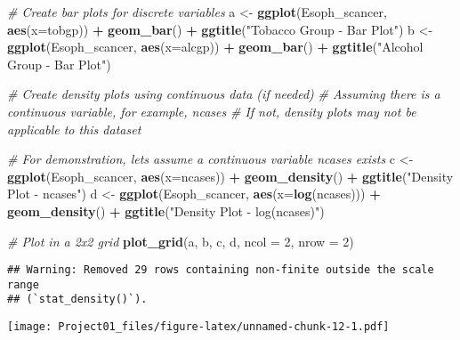 \documentclass[
]{article}
\newenvironment{Shaded}{\begin{snugshade}}{\end{snugshade}}
\newcommand{\AttributeTok}[1]{\textcolor[rgb]{0.13,0.29,0.53}{#1}}
\newcommand{\CommentTok}[1]{\textcolor[rgb]{0.56,0.35,0.01}{\textit{#1}}}
\newcommand{\DecValTok}[1]{\textcolor[rgb]{0.00,0.00,0.81}{#1}}
\newcommand{\FunctionTok}[1]{\textcolor[rgb]{0.13,0.29,0.53}{\textbf{#1}}}
\newcommand{\NormalTok}[1]{#1}
\newcommand{\OtherTok}[1]{\textcolor[rgb]{0.56,0.35,0.01}{#1}}
\newcommand{\SpecialCharTok}[1]{\textcolor[rgb]{0.81,0.36,0.00}{\textbf{#1}}}
\newcommand{\StringTok}[1]{\textcolor[rgb]{0.31,0.60,0.02}{#1}}
\begin{document}
\begin{Shaded}
\begin{Highlighting}[]
\CommentTok{\# Create bar plots for discrete variables}
\NormalTok{a }\OtherTok{\textless{}{-}} \FunctionTok{ggplot}\NormalTok{(Esoph\_scancer, }\FunctionTok{aes}\NormalTok{(}\AttributeTok{x=}\NormalTok{tobgp)) }\SpecialCharTok{+} \FunctionTok{geom\_bar}\NormalTok{() }\SpecialCharTok{+} \FunctionTok{ggtitle}\NormalTok{(}\StringTok{"Tobacco Group {-} Bar Plot"}\NormalTok{)}
\NormalTok{b }\OtherTok{\textless{}{-}} \FunctionTok{ggplot}\NormalTok{(Esoph\_scancer, }\FunctionTok{aes}\NormalTok{(}\AttributeTok{x=}\NormalTok{alcgp)) }\SpecialCharTok{+} \FunctionTok{geom\_bar}\NormalTok{() }\SpecialCharTok{+} \FunctionTok{ggtitle}\NormalTok{(}\StringTok{"Alcohol Group {-} Bar Plot"}\NormalTok{)}

\CommentTok{\# Create density plots using continuous data (if needed)}
\CommentTok{\# Assuming there is a continuous variable, for example, ncases}
\CommentTok{\# If not, density plots may not be applicable to this dataset}

\CommentTok{\# For demonstration, let\textquotesingle{}s assume a continuous variable ncases exists}
\NormalTok{c }\OtherTok{\textless{}{-}} \FunctionTok{ggplot}\NormalTok{(Esoph\_scancer, }\FunctionTok{aes}\NormalTok{(}\AttributeTok{x=}\NormalTok{ncases)) }\SpecialCharTok{+} \FunctionTok{geom\_density}\NormalTok{() }\SpecialCharTok{+} \FunctionTok{ggtitle}\NormalTok{(}\StringTok{"Density Plot {-} ncases"}\NormalTok{)}
\NormalTok{d }\OtherTok{\textless{}{-}} \FunctionTok{ggplot}\NormalTok{(Esoph\_scancer, }\FunctionTok{aes}\NormalTok{(}\AttributeTok{x=}\FunctionTok{log}\NormalTok{(ncases))) }\SpecialCharTok{+} \FunctionTok{geom\_density}\NormalTok{() }\SpecialCharTok{+} \FunctionTok{ggtitle}\NormalTok{(}\StringTok{"Density Plot {-} log(ncases)"}\NormalTok{)}

\CommentTok{\# Plot in a 2x2 grid}
\FunctionTok{plot\_grid}\NormalTok{(a, b, c, d, }\AttributeTok{ncol =} \DecValTok{2}\NormalTok{, }\AttributeTok{nrow =} \DecValTok{2}\NormalTok{)}
\end{Highlighting}
\end{Shaded}

\begin{verbatim}
## Warning: Removed 29 rows containing non-finite outside the scale range
## (`stat_density()`).
\end{verbatim}

\texttt{[image: Project01\_files/figure-latex/unnamed-chunk-12-1.pdf]}
\end{document}
